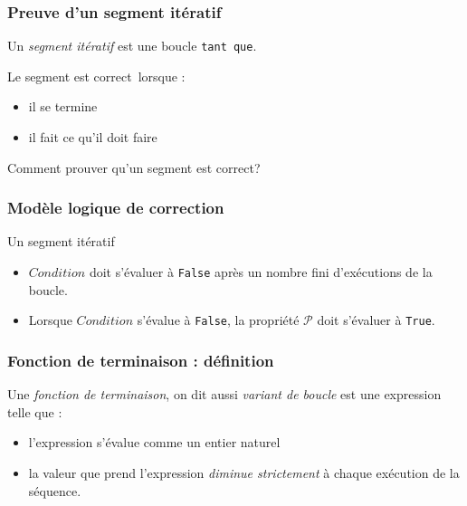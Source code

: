 



\begin{frame}
  \frametitle{Preuve d'un segment itératif}
Un \emph{segment itératif} est une boucle \og\texttt{tant que}\fg.

Le segment est \og correct\fg~lorsque :
\begin{itemize}
  \item il se termine
  \item il fait ce qu'il doit faire
\end{itemize}
Comment prouver qu'un segment est correct?
\end{frame}

\begin{frame}
  \frametitle{Modèle logique de correction}
\begin{algorithm}[H]
  \caption{Un segment itératif}
  \label{corsegit_1}
\end{algorithm}
\begin{itemize}
  \item $Condition$ doit s'évaluer à \texttt{False} après un nombre fini d'exécutions de la boucle.
  \item Lorsque $Condition$ s'évalue à \texttt{False}, la propriété $\mathcal{P}$ doit s'évaluer à \texttt{True}.
\end{itemize}
\end{frame}

\begin{frame}
  \frametitle{Fonction de terminaison : définition}
\begin{defi}
Une \emph{fonction de terminaison}, on dit aussi \emph{variant de boucle} est une expression telle que :
\begin{itemize}                                                                                                                                                                                                                                               \item l'expression s'évalue comme un entier naturel
\item la valeur que prend l'expression \emph{diminue strictement} à chaque exécution de la séquence.                                                                                                                                                                                                                             \end{itemize}
\end{defi}
\end{frame}

